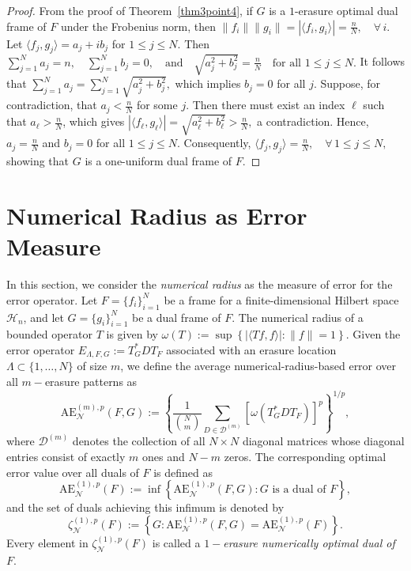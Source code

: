 \documentclass[final,1p,times]{elsarticle}
\begin{document}
\begin{proof}
From the proof of Theorem~\ref{thm3point4}, if $G$ is a $1$-erasure optimal dual frame of $F$ under the Frobenius norm, then $\|f_i\| \|g_i\| = |\langle f_i, g_i \rangle| = \frac{n}{N}, \quad \forall\, i.$ Let $\langle f_j, g_j \rangle = a_j + i b_j$ for $1 \leq j \leq N$. Then $\sum_{j=1}^N a_j = n, \quad  \sum_{j=1}^N b_j = 0, \quad \text{and} \quad  \sqrt{a_j^2 + b_j^2} = \frac{n}{N} \quad \text{for all } 1 \leq j \leq N.$ It follows that $\sum_{j=1}^N a_j = \sum_{j=1}^N \sqrt{a_j^2 + b_j^2},$ which implies $b_j = 0$ for all $j$. Suppose, for contradiction, that $a_j < \frac{n}{N}$ for some $j$. Then there must exist an index $\ell$ such that $a_\ell > \frac{n}{N}$, which gives $|\langle f_\ell, g_\ell \rangle| = \sqrt{a_\ell^2 + b_\ell^2} > \frac{n}{N},$ a contradiction. Hence, $a_j = \frac{n}{N}$ and $b_j = 0$ for all $1 \leq j \leq N$. Consequently, $\langle f_j, g_j \rangle = \frac{n}{N}, \quad \forall\, 1 \leq j \leq N,$ showing that $G$ is a one-uniform dual frame of $F$.
\end{proof}



\section{Numerical Radius as Error Measure}

In this section, we consider the \emph{numerical radius} as the measure of error for the error operator. Let \( F = \{f_i\}_{i=1}^N \) be a frame for a finite-dimensional Hilbert space \( \mathcal{H}_n \), and let \( G = \{g_i\}_{i=1}^N \) be a dual frame of \( F \). The numerical radius of a bounded operator \( T \) is given by $\omega(T) := \sup \left\{ \left| \langle Tf, f \rangle \right| : \|f\| = 1 \right\}.$ Given the error operator \( E_{\Lambda, F, G} := T_G^* D T_F \) associated with an erasure location \( \Lambda \subset \{1, \dots, N\} \) of size \( m \), we define the average numerical-radius-based error over all \( m-\)erasure patterns as
\[
\mathrm{AE}_{\mathcal{N}}^{(m),p}(F, G) := \left\{ \frac{1}{\binom{N}{m}} \sum_{D \in \mathcal{D}^{(m)}} \left[ \omega\left( T_G^* D T_F \right) \right]^p \right\}^{1/p},
\]
where \( \mathcal{D}^{(m)} \) denotes the collection of all \( N \times N \) diagonal matrices whose diagonal entries consist of exactly \( m \) ones and \( N - m \) zeros. The corresponding optimal error value over all duals of \( F \) is defined as
\[
\mathrm{AE}_{\mathcal{N}}^{(1),p}(F) := \inf \left\{ \mathrm{AE}_{\mathcal{N}}^{(1),p}(F, G) : G \text{ is a dual of } F \right\},
\]
and the set of duals achieving this infimum is denoted by
\[
\zeta_{\mathcal{N}}^{(1),p}(F) := \left\{ G : \mathrm{AE}_{\mathcal{N}}^{(1),p}(F, G) = \mathrm{AE}_{\mathcal{N}}^{(1),p}(F) \right\}.
\]
Every element in \( \zeta_{\mathcal{N}}^{(1),p}(F) \) is called a \textit{\( 1-\)erasure numerically optimal dual of \( F \)}.
\end{document}
